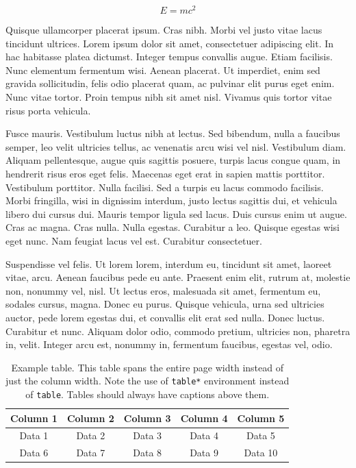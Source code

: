 \begin{equation}\label{eq:example}
    E = mc^2
\end{equation}

Quisque ullamcorper placerat ipsum. Cras nibh. Morbi vel justo vitae lacus tincidunt ultrices. Lorem ipsum dolor sit amet, consectetuer adipiscing elit. In hac habitasse platea dictumst. Integer tempus convallis augue. Etiam facilisis. Nunc elementum fermentum wisi. Aenean placerat. Ut imperdiet, enim sed gravida sollicitudin, felis odio placerat quam, ac pulvinar elit purus eget enim. Nunc vitae tortor. Proin tempus nibh sit amet nisl. Vivamus quis tortor vitae risus porta vehicula.

Fusce mauris. Vestibulum luctus nibh at lectus. Sed bibendum, nulla a faucibus semper, leo velit ultricies tellus, ac venenatis arcu wisi vel nisl. Vestibulum diam. Aliquam pellentesque, augue quis sagittis posuere, turpis lacus congue quam, in hendrerit risus eros eget felis. Maecenas eget erat in sapien mattis porttitor. Vestibulum porttitor. Nulla facilisi. Sed a turpis eu lacus commodo facilisis. Morbi fringilla, wisi in dignissim interdum, justo lectus sagittis dui, et vehicula libero dui cursus dui. Mauris tempor ligula sed lacus. Duis cursus enim ut augue. Cras ac magna. Cras nulla. Nulla egestas. Curabitur a leo. Quisque egestas wisi eget nunc. Nam feugiat lacus vel est. Curabitur consectetuer. 


Suspendisse vel felis. Ut lorem lorem, interdum eu, tincidunt sit amet, laoreet vitae, arcu. Aenean faucibus pede eu ante. Praesent enim elit, rutrum at, molestie non, nonummy vel, nisl. Ut lectus eros, malesuada sit amet, fermentum eu, sodales cursus, magna. Donec eu purus. Quisque vehicula, urna sed ultricies auctor, pede lorem egestas dui, et convallis elit erat sed nulla. Donec luctus. Curabitur et nunc. Aliquam dolor odio, commodo pretium, ultricies non, pharetra in, velit. Integer arcu est, nonummy in, fermentum faucibus, egestas vel, odio. 

\begin{table}[t]
    \centering
    \caption{Example table. This table spans the entire page width instead of just the column width. Note the use of \texttt{table*} environment instead of \texttt{table}. Tables should always have captions above them.}
    \begin{tabular}{|c|c|c|c|c|} %
        \hline %
        Column 1 & Column 2 & Column 3 & Column 4 & Column 5\\
        \hline
        Data 1 & Data 2 & Data 3 & Data 4 & Data 5\\
        Data 6 & Data 7 & Data 8 & Data 9 & Data 10\\
        \hline
    \end{tabular}
    \label{tab:example}
\end{table}

